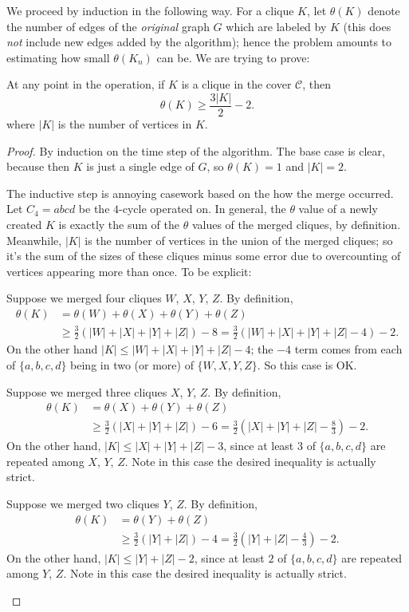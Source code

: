 \documentclass[11pt]{scrartcl}
\begin{document}
We proceed by induction in the following way.
For a clique $K$, let $\theta(K)$ denote the number of edges
of the \emph{original} graph $G$ which are labeled by $K$
(this does \emph{not} include new edges added by the algorithm);
hence the problem amounts to estimating how small $\theta(K_n)$ can be.
We are trying to prove:
\begin{claim*}
  At any point in the operation, if $K$ is a clique in
  the cover $\mathcal C$, then
  \[ \theta(K) \ge \frac{3 |K|}{2} - 2. \]
  where $|K|$ is the number of vertices in $K$.
\end{claim*}
\begin{proof}
  By induction on the time step of the algorithm.
  The base case is clear, because then $K$ is just a single edge of $G$,
  so $\theta(K) = 1$ and $|K| = 2$.

  The inductive step is annoying casework based on the how the merge occurred.
  Let $C_4 = abcd$ be the $4$-cycle operated on.
  In general, the $\theta$ value of a newly created $K$ is
  exactly the sum of the $\theta$ values of the merged cliques, by definition.
  Meanwhile, $|K|$ is the number of vertices in the union of the merged cliques;
  so it's the sum of the sizes of these cliques
  minus some error due to overcounting of vertices appearing more than once.
  To be explicit:
  \begin{itemize}
    \ii Suppose we merged four cliques $W$, $X$, $Y$, $Z$.
    By definition,
    \begin{align*}
      \theta(K) &= \theta(W)+\theta(X)+\theta(Y)+\theta(Z) \\
      &\ge \frac32(|W|+|X|+|Y|+|Z|) - 8 = \frac32(|W|+|X|+|Y|+|Z|-4) - 2.
    \end{align*}
    On the other hand $|K| \le |W|+|X|+|Y|+|Z|-4$;
    the $-4$ term comes from each of $\{a,b,c,d\}$ being in
    two (or more) of $\{W,X,Y,Z\}$. So this case is OK.

    \ii Suppose we merged three cliques $X$, $Y$, $Z$.
    By definition,
    \begin{align*}
      \theta(K) &= \theta(X)+\theta(Y)+\theta(Z) \\
      &\ge \frac32(|X|+|Y|+|Z|) - 6 = \frac32\left(|X|+|Y|+|Z|-\frac83\right) - 2.
    \end{align*}
    On the other hand, $|K| \le |X|+|Y|+|Z| - 3$,
    since at least $3$ of $\{a,b,c,d\}$ are repeated among $X$, $Y$, $Z$.
    Note in this case the desired inequality is actually strict.

    \ii Suppose we merged two cliques $Y$, $Z$.
    By definition,
    \begin{align*}
      \theta(K) &= \theta(Y)+\theta(Z) \\
      &\ge \frac32(|Y|+|Z|) - 4 = \frac32\left(|Y|+|Z|-\frac43\right) - 2.
    \end{align*}
    On the other hand, $|K| \le |Y|+|Z| - 2$,
    since at least $2$ of $\{a,b,c,d\}$ are repeated among $Y$, $Z$.
    Note in this case the desired inequality is actually strict. \qedhere
  \end{itemize}
\end{proof}
\end{document}
